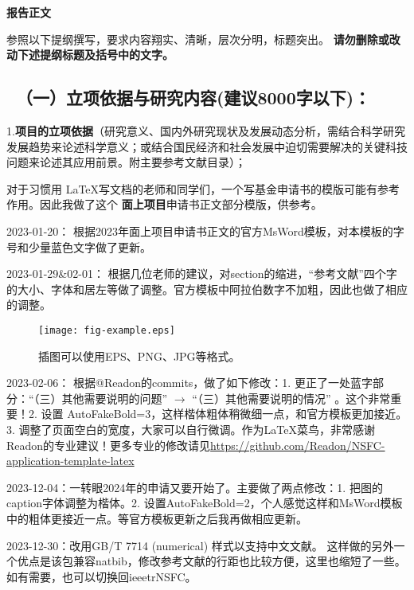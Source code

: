 \documentclass[12pt,UTF8,AutoFakeBold=2,a4paper]{ctexart} %
\newcommand{\sanhao}{\fontsize{16pt}{\baselineskip}\selectfont}
\newcommand{\sihao}{\fontsize{14pt}{\baselineskip}\selectfont}
\begin{document}
\begin{center}
{\sanhao \kaishu \bfseries 报告正文}
\end{center}

{\sihao \kaishu 参照以下提纲撰写，要求内容翔实、清晰，层次分明，标题突出。{\color{MsBlue} \bfseries 请勿删除或改动下述提纲标题及括号中的文字。}}
\vskip -5mm
{\color{MsBlue} \subsection{\sihao \kaishu \quad \ （一）立项依据与研究内容(建议8000字以下)：}}%

{\sihao \kaishu \color{MsBlue} 1.{\bfseries 项目的立项依据}（研究意义、国内外研究现状及发展动态分析，需结合科学研究发展趋势来论述科学意义；或结合国民经济和社会发展中迫切需要解决的关键科技问题来论述其应用前景。附主要参考文献目录）；}

对于习惯用 \LaTeX 写文档的老师和同学们，一个写基金申请书的模版可能有参考作用。因此我做了这个{\bfseries \color{Bittersweet} 面上项目}申请书正文部分模版，供参考。

2023-01-20： 根据2023年面上项目申请书正文的官方MsWord模板，对本模板的字号和少量蓝色文字做了更新。

2023-01-29\&02-01： 根据几位老师的建议，对section的缩进，“参考文献”四个字的大小、字体和居左等做了调整。官方模板中阿拉伯数字不加粗，因此也做了相应的调整。



\begin{figure}[!th]
\begin{center}
\texttt{[image: fig-example.eps]}
\caption{{\kaishu 插图可以使用EPS、PNG、JPG等格式。}}
\label{fig:example}
\end{center}
\end{figure}

2023-02-06： 根据@Readon的commits，做了如下修改：1. 更正了一处蓝字部分：``（三）其他需要说明的问题'' $\rightarrow$ ``（三）其他需要说明的情况'' 。这个非常重要！2. 设置 AutoFakeBold=3，这样楷体粗体稍微细一点，和官方模板更加接近。3. 调整了页面空白的宽度，大家可以自行微调。作为\LaTeX 菜鸟，非常感谢Readon的专业建议！更多专业的修改请见\url{https://github.com/Readon/NSFC-application-template-latex}

2023-12-04：一转眼2024年的申请又要开始了。主要做了两点修改：1. 把图的caption字体调整为楷体。2. 设置AutoFakeBold=2，个人感觉这样和MsWord模板中的粗体更接近一点。等官方模板更新之后我再做相应更新。

2023-12-30：改用GB/T 7714 (numerical) 样式以支持中文文献。 这样做的另外一个优点是该包兼容natbib，修改参考文献的行距也比较方便，这里也缩短了一些。如有需要，也可以切换回ieeetrNSFC。
\end{document}
